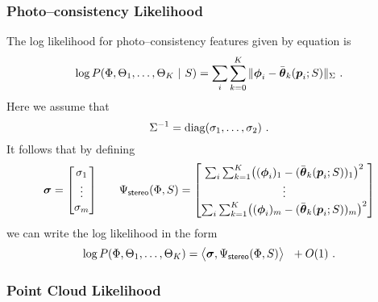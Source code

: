 \subsubsection{Photo--consistency Likelihood}
The log likelihood for photo--consistency features given by equation
 is
\begin{equation}
  \label{eq:stereo-loglik2}
  \log P(\Features,\AuxFeatures_1,\ldots,\AuxFeatures_{\NumViews}
            ~|~ \Seam) 
  =
  \sum_i \sum_{k=0}^{\NumViews} 
    \|\Feature_i-\ComputedAuxFeature_k(\Pixel_i;\Seam)\|_{\StereoCov} ~.
\end{equation}
Here we assume that
\begin{equation}
  \StereoCov^{-1} = \diag(\StereoCoef_1,\ldots,\StereoCoef_2) ~.
\end{equation}
It follows that by defining
\begin{align}
  \StereoModel =
  \begin{bmatrix}
    \StereoCoef_1 \\
    \vdots \\
    \StereoCoef_m
  \end{bmatrix}
  & \quad &  
  \JointFtr_{\textsf{stereo}}(\Features,\Seam) =
  \begin{bmatrix}
    \sum_i \sum_{k=1}^K \bigl(
      (\Feature_i)_1 - (\ComputedAuxFeature_k(\Pixel_i;\Seam))_1
    \bigr)^2\\
    \vdots \\
    \sum_i \sum_{k=1}^K \bigl(
      (\Feature_i)_m - (\ComputedAuxFeature_k(\Pixel_i;\Seam))_m
    \bigr)^2
  \end{bmatrix}
\end{align}
we can write the log likelihood  in the form
\begin{equation}
  \label{eq:linear-stereo-model}
  \log P(\Features,\AuxFeatures_1,\ldots,\AuxFeatures_{\NumViews})
  =
  \bigl\langle
    \StereoModel, \JointFtr_{\textsf{stereo}}(\Features,\Seam)
  \bigr\rangle ~~ + O(1) ~.
\end{equation}

\subsubsection{Point Cloud Likelihood}

